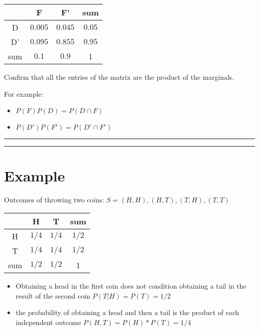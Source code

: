 \documentclass[
]{book}
\providecommand{\tightlist}{%
  \setlength{\itemsep}{0pt}\setlength{\parskip}{0pt}}
\begin{document}
\begin{longtable}[]{@{}cccc@{}}
\toprule
& F & F' & sum \\
\midrule
\endhead
D & \(0.005\) & \(0.045\) & \(0.05\) \\
D' & \(0.095\) & \(0.855\) & \(0.95\) \\
sum & \(0.1\) & \(0.9\) & 1 \\
\bottomrule
\end{longtable}

Confirm that all the entries of the matrix are the product of the marginals.

For example:

\begin{itemize}
\tightlist
\item
  \(P(F)P(D)= P(D \cap F)\)
\item
  \(P(D')P(F')=P(D' \cap F')\)
\end{itemize}

\begin{center}\rule{0.5\linewidth}{0.5pt}\end{center}

\begin{center}\rule{0.5\linewidth}{0.5pt}\end{center}

\hypertarget{example-5}{%
\section{Example}\label{example-5}}

Outcomes of throwing two coins: \(S={(H,H), (H,T), (T,H), (T,T)}\)

\begin{longtable}[]{@{}cccc@{}}
\toprule
& H & T & sum \\
\midrule
\endhead
H & \(1/4\) & \(1/4\) & \(1/2\) \\
T & \(1/4\) & \(1/4\) & \(1/2\) \\
sum & \(1/2\) & \(1/2\) & 1 \\
\bottomrule
\end{longtable}

\begin{itemize}
\tightlist
\item
  Obtaining a head in the first coin does not condition obtaining a tail in the result of the second coin \(P(T|H)=P(T)=1/2\)
\item
  the probability of obtaining a head and then a tail is the product of each independent outcome \(P(H, T)=P(H)*P(T)=1/4\)
\end{itemize}
\end{document}
